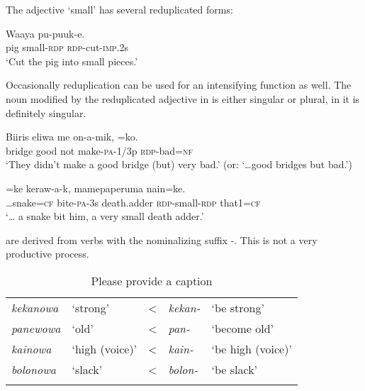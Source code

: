 The adjective  `small' has several reduplicated forms: \textstyleEmphasizedVernacularWords{,} \textstyleEmphasizedVernacularWords{,}  

\ea%
\label{ex:3:x486}
\gll Waaya  pu-puuk-e. \\
pig small-\textsc{rdp} \textsc{rdp}-cut-\textsc{imp}.2s\\
\glt`Cut the pig into small pieces.'
\z

Occasionally reduplication can be used for an intensifying function as well. The noun modified by the reduplicated adjective in  is either singular or plural, in  it is definitely singular.

\ea%
\label{ex:3:x485}
\gll Biiris eliwa me on-a-mik, =ko. \\
bridge good not make-\textsc{pa}-1/3p \textsc{rdp}-bad=\textsc{nf}\\
\glt`They didn't make a good bridge (but) very bad.' (or: `{\dots}good bridges but bad.')
\z

\ea%
\label{ex:3:x86}
=ke keraw-a-k, mamepaperuma  nain=ke. \\
{\dots}snake=\textsc{cf} bite-\textsc{pa}-3s death.adder \textsc{rdp}-small-\textsc{rdp} that1=\textsc{cf}\\
\glt`{\dots} a snake bit him, a very small death adder.'
\z

 are derived from verbs with the nominalizing suffix \nobreakdash-. This is not a very productive process.

\begin{table}
\caption{Please provide a caption}
\label{} 
\begin{tabular}{>{\itshape}llc>{\itshape}ll}
\mytoprule
kekanowa &`strong' &{{\textless}} &kekan- &`be strong'\\
panewowa &`old' &{{\textless}} &pan- &`become old'\\
kainowa &`high (voice)' &{{\textless}} &kain- &`be high (voice)'\\
bolonowa &`slack' &{{\textless}} &bolon- &`be slack'\\
\mybottomrule
\end{tabular}
\end{table}


